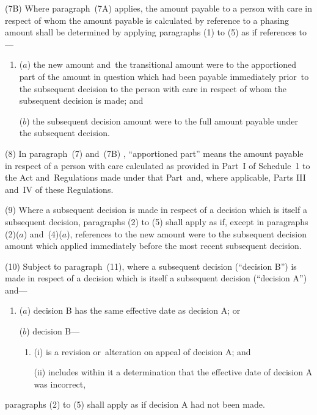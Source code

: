 \documentclass[12pt,a4paper]{article}
\begin{document}
(7B) Where paragraph~(7A) applies, the amount payable to a person with care in respect of whom the amount payable is calculated by reference to a phasing amount shall be determined by applying paragraphs (1) to (5) as if references to—
\begin{enumerate}\item[]
($a$) the new amount and~the transitional amount were to the apportioned part of the amount in question which had been payable immediately prior~to the subsequent decision to the person with care in respect of whom the subsequent decision is made; and

($b$) the subsequent decision amount were to the full amount payable under the subsequent decision.
\end{enumerate}

(8) In paragraph~(7)
and~(7B)%
, “apportioned part” means the amount payable in respect of a person with care calculated as provided in Part~I of Schedule~1 to the Act and~Regulations made under that Part~and, where applicable, Parts III and~IV of these Regulations.

(9) 
Where  %
a subsequent decision is made in respect of a decision which is itself a subsequent decision, paragraphs (2) to (5) shall apply as if, except in paragraphs (2)($a$)  and~(4)($a$), references to the new amount were to the subsequent decision amount which applied immediately before the most recent subsequent decision.

(10) 
Subject to paragraph~(11), where  %
a subsequent decision (“decision B”) is made in respect of a decision which is itself a subsequent decision (“decision A”) and—
\begin{enumerate}\item[]
($a$) decision B has the same effective date as decision A; or

($b$) decision B—
\begin{enumerate}\item[]
(i) is a revision or~alteration on appeal of decision A; and

(ii) includes within it a determination that the effective date of decision A was incorrect,
\end{enumerate}
\end{enumerate}
paragraphs (2) to (5) shall apply 
as if decision A had not been made.  %
\end{document}
